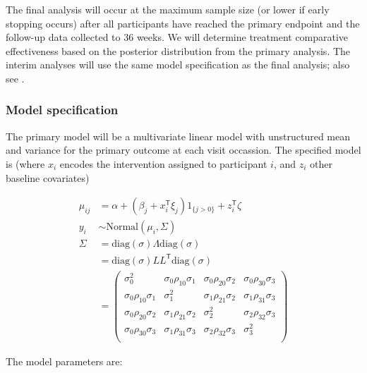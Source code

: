 \documentclass[
]{article}
\begin{document}
The final analysis will occur at the maximum sample size (or lower if early stopping occurs) after all participants have reached the primary endpoint and the follow-up data collected to 36 weeks.
We will determine treatment comparative effectiveness based on the posterior distribution from the primary analysis.
The interim analyses will use the same model specification as the final analysis; also see .

\hypertarget{model-specification}{%
  \subsubsection{Model specification}\label{model-specification}}

The primary model will be a multivariate linear model with unstructured mean and variance for the primary outcome at each visit occassion.
The specified model is (where $x_i$ encodes the intervention assigned to participant $i$, and $z_i$ other baseline covariates)

$$
  \begin{aligned}
    \mu_{ij} &= \alpha + (\beta_j + x_i^\mathsf{T}\xi_{j})1_{\{j>0\}} + z_i^\mathsf{T}\zeta \\
    y_i &\sim \text{Normal}(\mu_i, \Sigma) \\
    \Sigma &= \text{diag}(\sigma)\Lambda\text{diag}(\sigma) \\
    &= \text{diag}(\sigma)LL^\mathsf{T}\text{diag}(\sigma) \\
    &= \begin{pmatrix}
      \sigma_0^2 & \sigma_0\rho_{10}\sigma_1 & \sigma_0\rho_{20}\sigma_2 & \sigma_0\rho_{30}\sigma_3 \\
      \sigma_0\rho_{10}\sigma_1 & \sigma_{1}^2 & \sigma_1\rho_{21}\sigma_2 & \sigma_1\rho_{31}\sigma_3 \\
      \sigma_0\rho_{20}\sigma_2 & \sigma_1\rho_{21}\sigma_2 & \sigma_{2}^2 & \sigma_2\rho_{32}\sigma_3 \\
      \sigma_0\rho_{30}\sigma_3 & \sigma_1\rho_{31}\sigma_3 & \sigma_2\rho_{32}\sigma_3 & \sigma_{3}^2 \\
    \end{pmatrix}
  \end{aligned}
$$

The model parameters are:
\end{document}
